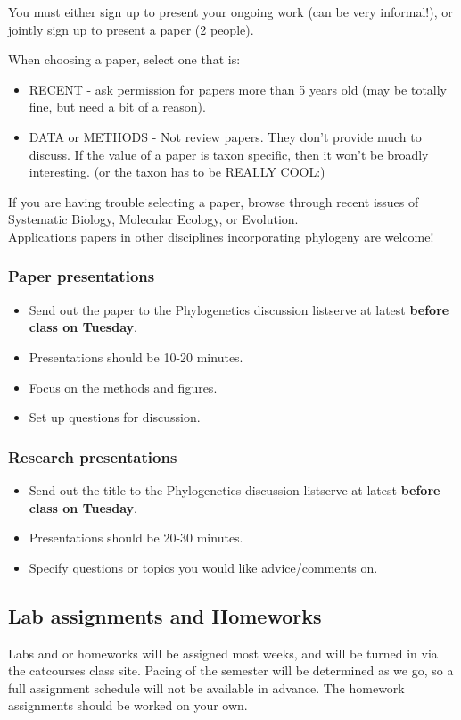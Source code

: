 \documentclass{article}
\begin{document}
{You must either sign up to present your ongoing work (can be very informal!), or jointly sign up to present a paper (2 people).

When choosing a paper, select one that is:
\begin{itemize}
 \item RECENT - ask permission for papers more than 5 years old (may be totally fine, but need a bit of a reason).
 \item DATA or METHODS - Not review papers. They don't provide much to discuss. If the value of a paper is taxon specific, then it won't be broadly interesting. (or the taxon has to be REALLY COOL:)
\end{itemize}
If you are having trouble selecting a paper, browse through recent issues of Systematic Biology, Molecular Ecology, or Evolution.\\
Applications papers in other disciplines incorporating phylogeny are welcome!\\

\subsubsection*{Paper presentations}
\begin{itemize}
 \item Send out the paper to the Phylogenetics discussion listserve at latest \textbf{before class on Tuesday}.
 \item Presentations should be 10-20 minutes.
 \item Focus on the methods and figures.
 \item Set up questions for discussion.
\end{itemize}

\subsubsection*{Research presentations}
\begin{itemize}
 \item Send out the title to the Phylogenetics discussion listserve at latest \textbf{before class on Tuesday}.
 \item Presentations should be 20-30 minutes.
 \item Specify questions or topics you would like advice/comments on.
\end{itemize}


\subsection*{Lab assignments and Homeworks}
Labs and or homeworks will be assigned most weeks, and will be turned in via the catcourses class site.
Pacing of the semester will be determined as we go, 
so a full assignment schedule will not be available in advance.
The homework assignments should be worked on your own.

}
\end{document}
